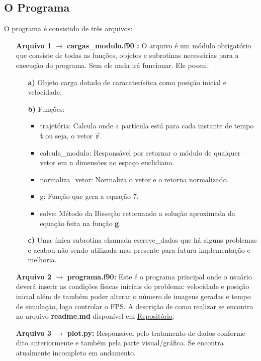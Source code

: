 \documentclass{article}
\begin{document}
\subsection{O Programa}
O programa é consistido de três arquivos:
\begin{itemize}
    \item[\textbf{Arquivo 1} $\xrightarrow{}$] \textbf{cargas\_modulo.f90 :}
    O arquivo é um módulo obrigatório que consiste de todas as funções, objetos e subrotinas necessárias para a execução do programa. Sem ele nada irá funcionar. Ele possui:
    \begin{itemize}
        \item[\textbf{a)}] Objeto carga dotado de caracaterísitca como posição inicial e velocidade.
        \item[\textbf{b)}] Funções:
        \begin{itemize}
            \item trajetória: Calcula onde a partícula está para cada instante de tempo \textbf{t} ou seja, o vetor $\vec{\textbf{r}}$.
            \item calcula\_modulo: Responsável por retornar o módulo de qualquer vetor em n dimensões no espaço euclidiano.
            \item normaliza\_vetor: Normaliza o vetor e o retorna normalizado.
            \item g: Função que gera a equação 7.
            \item solve: Método da Bisseção retornando a solução aproximada da equação feita na função \textbf{g}.   
        \end{itemize}
        \item[\textbf{c)}] Uma única subrotina chamada escreve\_dados que há alguns problemas e acabou não sendo utilizada mas presente para futura implementação e melhoria.
    \end{itemize}
    \item[\textbf{Arquivo 2 $\xrightarrow{}$}] \textbf{programa.f90:} Este é o programa principal onde o usuário deverá inserir as condições físicas iniciais do problema: velocidade e posição inicial além de também poder alterar o número de imagens geradas e tempo de simulação, logo controlar o FPS. A descrição de como realizar se encontra no arquivo \textbf{readme.md} disponível em \href{https://github.com/Kiberan/Projeto_Final_Fis492}{Repositório}.
    \item[\textbf{Arquivo 3 $\xrightarrow{}$}] \textbf{plot.py:} Responsável pelo tratamento de dados conforme dito anteriormente e também pela parte visual/gráfica. Se encontra atualmente incompleto em andamento.
\end{itemize}
\newpage
\end{document}
